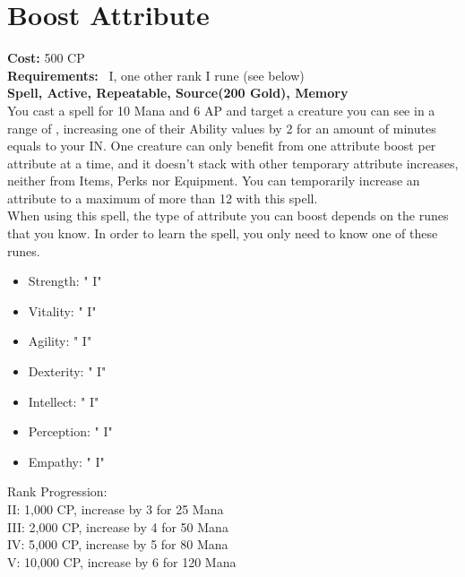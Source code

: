 \section{Boost Attribute}\label{spell:boostAttribute}
\textbf{Cost:} 500 CP\\
\textbf{Requirements:}~ I, one other rank I rune (see below)\\
\textbf{Spell, Active, Repeatable, Source(200 Gold), Memory}\\
You cast a spell for 10 Mana and 6 AP and target a creature you can see in a range of , increasing one of their Ability values by 2 for an amount of minutes equals to your IN.
One creature can only benefit from one attribute boost per attribute at a time, and it doesn't stack with other temporary attribute increases, neither from Items, Perks nor Equipment.
You can temporarily increase an attribute to a maximum of more than 12 with this spell.\\
When using this spell, the type of attribute you can boost depends on the runes that you know.
In order to learn the spell, you only need to know one of these runes.\\
\begin{itemize}
    \item Strength: " I"
    \item Vitality: " I"
    \item Agility: " I"
    \item Dexterity: " I"
    \item Intellect: " I"
    \item Perception: " I"
    \item Empathy: " I"
\end{itemize}
Rank Progression:\\
II: 1,000 CP, increase by 3 for 25 Mana\\
III: 2,000 CP, increase by 4 for 50 Mana\\
IV: 5,000 CP, increase by 5 for 80 Mana\\
V: 10,000 CP, increase by 6 for 120 Mana\\